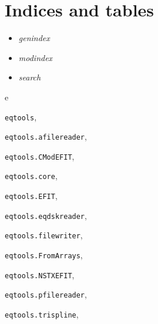 \documentclass[letterpaper,10pt,english]{sphinxmanual}
\begin{document}
\chapter{Indices and tables}
\label{index:indices-and-tables}\begin{itemize}
\item {} 
\emph{genindex}

\item {} 
\emph{modindex}

\item {} 
\emph{search}

\end{itemize}


\renewcommand{\indexname}{Python Module Index}
\begin{theindex}
\def\bigletter#1{{\Large\sffamily#1}\nopagebreak\vspace{1mm}}
\bigletter{e}
\item {\texttt{eqtools}}, \pageref{eqtools:module-eqtools}
\item {\texttt{eqtools.afilereader}}, \pageref{eqtools:module-eqtools.afilereader}
\item {\texttt{eqtools.CModEFIT}}, \pageref{eqtools:module-eqtools.CModEFIT}
\item {\texttt{eqtools.core}}, \pageref{eqtools:module-eqtools.core}
\item {\texttt{eqtools.EFIT}}, \pageref{eqtools:module-eqtools.EFIT}
\item {\texttt{eqtools.eqdskreader}}, \pageref{eqtools:module-eqtools.eqdskreader}
\item {\texttt{eqtools.filewriter}}, \pageref{eqtools:module-eqtools.filewriter}
\item {\texttt{eqtools.FromArrays}}, \pageref{eqtools:module-eqtools.FromArrays}
\item {\texttt{eqtools.NSTXEFIT}}, \pageref{eqtools:module-eqtools.NSTXEFIT}
\item {\texttt{eqtools.pfilereader}}, \pageref{eqtools:module-eqtools.pfilereader}
\item {\texttt{eqtools.trispline}}, \pageref{eqtools:module-eqtools.trispline}
\end{theindex}

\renewcommand{\indexname}{Index}
\printindex
\end{document}
